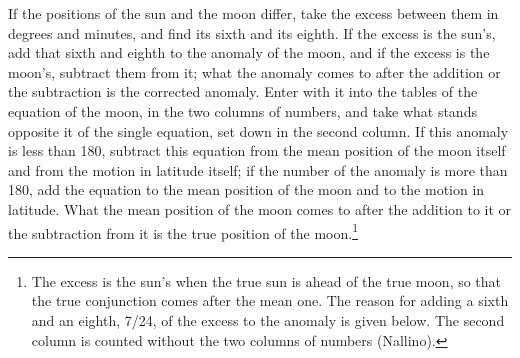 \documentclass[11pt]{article}
\begin{document}
\par If the positions of the sun and the moon differ, take the excess between them in degrees and minutes, and find its sixth and its eighth. If the excess is the sun's, add that sixth and eighth to the anomaly of the moon, and if the excess is the moon's, subtract them from it; what the anomaly comes to after the addition or the subtraction is the corrected anomaly. Enter with it into the tables of the equation of the moon, in the two columns of numbers, and take what stands opposite it of the single equation, set down in the second column. If this anomaly is less than 180, subtract this equation from the mean position of the moon itself and from the motion in latitude itself; if the number of the anomaly is more than 180, add the equation to the mean position of the moon and to the motion in latitude. What the mean position of the moon comes to after the addition to it or the subtraction from it is the true position of the moon.\footnote{The excess is the sun's when the true sun is ahead of the true moon, so that the true conjunction comes after the mean one. The reason for adding a sixth and an eighth, 7/24, of the excess to the anomaly is given below. The second column is counted without the two columns of numbers (Nallino).}\par
\end{document}
